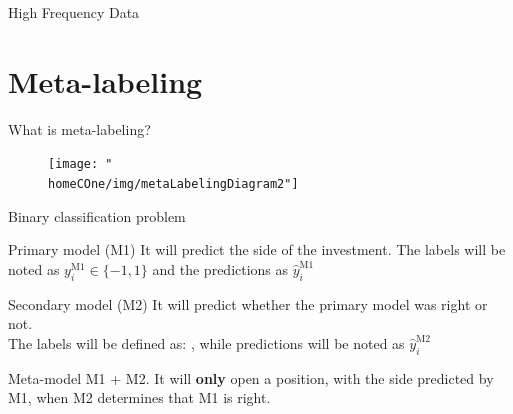 \documentclass{beamer} %
\newcommand{\homeCOne}{../../Chapter 1 - Metalabeling/Draft}
\begin{document}
\begin{frame}{High Frequency Data}
	\begin{table}[htbp]
	\caption{Example of tick data (2013-01-02)}
	\centering
	\end{table}
\end{frame}

\section{Meta-labeling}
\begin{frame}{What is meta-labeling?}
	\begin{figure}[htbp]
		\centering
		\texttt{[image: "\\homeCOne/img/metaLabelingDiagram2"]}
\end{figure}
\end{frame}

\begin{frame}{Binary classification problem}
	\begin{block}{Primary model (M1)}
		It will predict the side of the investment. The labels will be noted 
		as $y_i^{\text{M1}} \in \{-1, 1\}$ and the predictions as 
		$\widehat{y}_i^{\text{M1}}$
	\end{block}
	\begin{block}{Secondary model (M2)}
		It will predict whether the primary model was right or not.\\
		The labels will be defined as:
		, while predictions will be noted as $\widehat{y}_i^{\text{M2}}$
	\end{block}
	\begin{block}{Meta-model}
		M1 + M2. It will \textbf{only} open a position, with the side 
		predicted by M1, when M2 determines that M1 is right.
	\end{block}
\end{frame}
\end{document}
